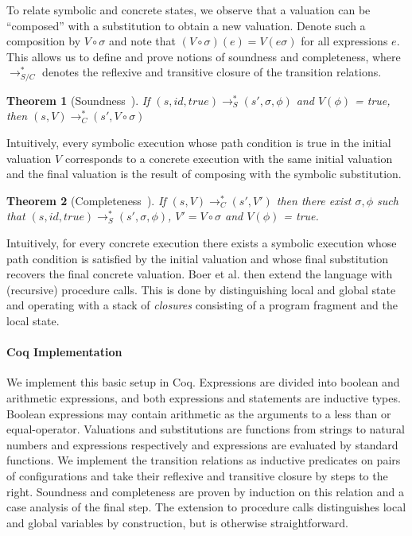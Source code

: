 \documentclass[submission,copyright,creativecommons]{eptcs}
\newtheorem{theorem}{Theorem}
\begin{document}
To relate symbolic and concrete states, we observe that a valuation can be ``composed'' with a substitution
to obtain a new valuation. Denote such a composition by $V \circ \sigma$ and note that $(V \circ \sigma)(e) = V(e\sigma)$
for all expressions $e$.
This allows us to define and prove notions of soundness and completeness, where
$\rightarrow_{S/C}^{*}$ denotes the reflexive and transitive closure of the transition relations.
\begin{theorem}[Soundness~{\cite{boer2021}}]
  If $(s, id, true) \rightarrow_{S}^{*} (s', \sigma, \phi)$ and $V(\phi)$ = true,
  then $(s, V) \rightarrow_{C}^{*} (s', V \circ \sigma)$
\end{theorem}
Intuitively, every symbolic execution whose path condition is true in the initial valuation $V$
corresponds to a concrete execution with the same initial valuation and the final valuation is
the result of composing with the symbolic substitution.
\begin{theorem}[Completeness~{\cite{boer2021}}]
  If $(s, V) \rightarrow_{C}^{*} (s', V')$ then there exist $\sigma, \phi$ such that
  $(s, id, true) \rightarrow_{S}^{*} (s', \sigma, \phi)$, $V' = V \circ \sigma$ and $V(\phi)$ = true.
\end{theorem}
Intuitively, for every concrete execution there exists a symbolic execution whose path condition
is satisfied by the initial valuation and whose final substitution recovers the final concrete valuation.
Boer et al. then extend the language with (recursive) procedure calls.
This is done by distinguishing local and global state and operating with a stack of \emph{closures} consisting
of a program fragment and the local state.
\paragraph{Coq Implementation}
We implement this basic setup in Coq. Expressions are divided into boolean and arithmetic expressions,
and both expressions and statements are inductive types. Boolean expressions may contain arithmetic as the
arguments to a less than or equal-operator.
Valuations and substitutions are functions from strings to natural numbers and expressions respectively and
expressions are evaluated by standard functions.
We implement the transition relations as inductive predicates on pairs of configurations and take their
reflexive and transitive closure by steps to the right.
Soundness and completeness are proven by induction on this relation and a case analysis of the final step.
The extension to procedure calls distinguishes local and global variables by construction, but is
otherwise straightforward.
\end{document}
